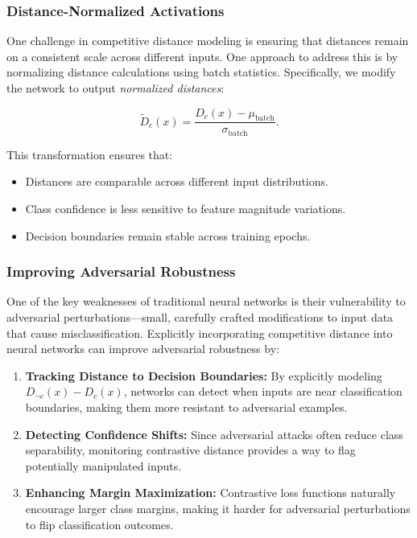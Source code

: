 \subsubsection{Distance-Normalized Activations}

One challenge in competitive distance modeling is ensuring that distances remain on a consistent scale across different inputs. One approach to address this is by normalizing distance calculations using batch statistics. Specifically, we modify the network to output \textit{normalized distances}:

\[
\tilde{D}_c(x) = \frac{D_c(x) - \mu_{\text{batch}}}{\sigma_{\text{batch}}}.
\]

This transformation ensures that:

\begin{itemize}
    \item Distances are comparable across different input distributions.
    \item Class confidence is less sensitive to feature magnitude variations.
    \item Decision boundaries remain stable across training epochs.
\end{itemize}

\subsubsection{Improving Adversarial Robustness}

One of the key weaknesses of traditional neural networks is their vulnerability to adversarial perturbations—small, carefully crafted modifications to input data that cause misclassification. Explicitly incorporating competitive distance into neural networks can improve adversarial robustness by:

\begin{enumerate}
    \item \textbf{Tracking Distance to Decision Boundaries:} By explicitly modeling \( D_{\neg c}(x) - D_c(x) \), networks can detect when inputs are near classification boundaries, making them more resistant to adversarial examples.
    \item \textbf{Detecting Confidence Shifts:} Since adversarial attacks often reduce class separability, monitoring contrastive distance provides a way to flag potentially manipulated inputs.
    \item \textbf{Enhancing Margin Maximization:} Contrastive loss functions naturally encourage larger class margins, making it harder for adversarial perturbations to flip classification outcomes.
\end{enumerate}

